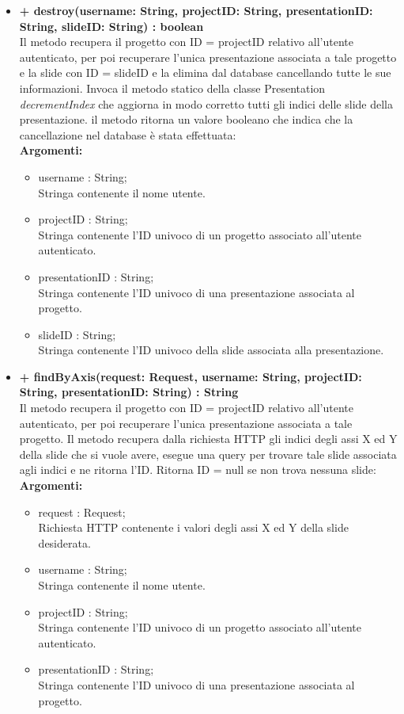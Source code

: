 \begin{itemize}
			\item \textbf{+ destroy(username: String, projectID: String, presentationID: String, slideID: String) : boolean}\\
				Il metodo recupera il progetto con ID = projectID relativo all'utente autenticato, per poi recuperare l'unica presentazione associata a tale progetto e la \gls{slide} con ID = slideID e la elimina dal \gls{database} cancellando tutte le sue informazioni. Invoca il metodo statico della classe Presentation \textit{decrementIndex} che aggiorna in modo corretto tutti gli indici delle \gls{slide} della presentazione. il metodo ritorna un valore booleano che indica che la cancellazione nel \gls{database} è stata effettuata:\\
				\textbf{Argomenti:}
				\begin{itemize}
					\item username : String; \\
					Stringa contenente il nome utente.
					\item projectID : String; \\
					Stringa contenente l'ID univoco di un progetto associato all'utente autenticato.
					\item presentationID : String; \\
					Stringa contenente l'ID univoco di una presentazione associata al progetto.
					\item slideID : String; \\
					Stringa contenente l'ID univoco della \gls{slide} associata alla presentazione.
				\end{itemize}
				
			\item \textbf{+ findByAxis(request: Request, username: String, projectID: String, presentationID: String) : String}\\
			Il metodo recupera il progetto con ID = projectID relativo all'utente autenticato, per poi recuperare l'unica presentazione associata a tale progetto. Il metodo recupera dalla richiesta HTTP gli indici degli assi X ed Y della \gls{slide} che si vuole avere, esegue una query per trovare tale \gls{slide} associata agli indici e ne ritorna l'ID. Ritorna ID = null se non trova nessuna \gls{slide}:\\
			\textbf{Argomenti:}
			\begin{itemize}
				\item request : Request;\\
				Richiesta HTTP contenente i valori degli assi X ed Y della \gls{slide} desiderata.
				\item username : String; \\
				Stringa contenente il nome utente.
				\item projectID : String; \\
				Stringa contenente l'ID univoco di un progetto associato all'utente autenticato.
				\item presentationID : String; \\
				Stringa contenente l'ID univoco di una presentazione associata al progetto.
			\end{itemize}
\end{itemize}

